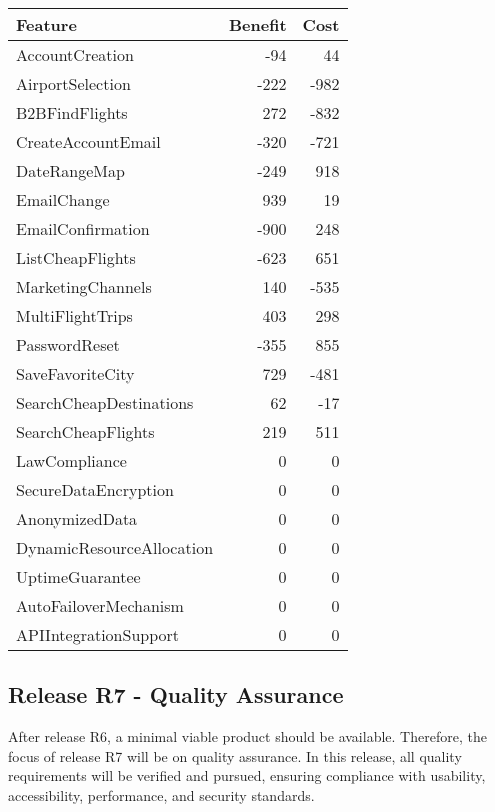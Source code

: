 \begin{tabular}{lrr}
\toprule
\textbf{Feature} & \textbf{Benefit} & \textbf{Cost} \\
\midrule
AccountCreation & -94 & 44 \\
AirportSelection & -222 & -982 \\
B2BFindFlights & 272 & -832 \\
CreateAccountEmail & -320 & -721 \\
DateRangeMap & -249 & 918 \\
EmailChange & 939 & 19 \\
EmailConfirmation & -900 & 248 \\
ListCheapFlights & -623 & 651 \\
MarketingChannels & 140 & -535 \\
MultiFlightTrips & 403 & 298 \\
PasswordReset & -355 & 855 \\
SaveFavoriteCity & 729 & -481 \\
SearchCheapDestinations & 62 & -17 \\
SearchCheapFlights & 219 & 511 \\
LawCompliance & 0 & 0 \\
SecureDataEncryption & 0 & 0 \\
AnonymizedData & 0 & 0 \\
DynamicResourceAllocation & 0 & 0 \\
UptimeGuarantee & 0 & 0 \\
AutoFailoverMechanism & 0 & 0 \\
APIIntegrationSupport & 0 & 0 \\
\bottomrule
\end{tabular}

\subsection{Release R7 - Quality Assurance}
After release R6, a minimal viable product should be available. Therefore, the focus of release R7 will be on quality assurance. In this release, all quality requirements will be verified and pursued, ensuring compliance with usability, accessibility, performance, and security standards.
